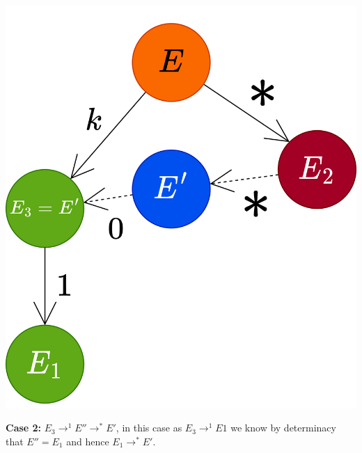 \begin{center}
	\includegraphics[scale=0.1]{structural_induction/images/confluence_inductive_case_A.drawio.png}
\end{center}
\textbf{Case 2:} $E_3 \to^1 E'' \to^* E'$, in this case as $E_3 \to^1 E1$ we know by determinacy that $E'' = E_1$ and hence $E_1 \to^* E'$.
